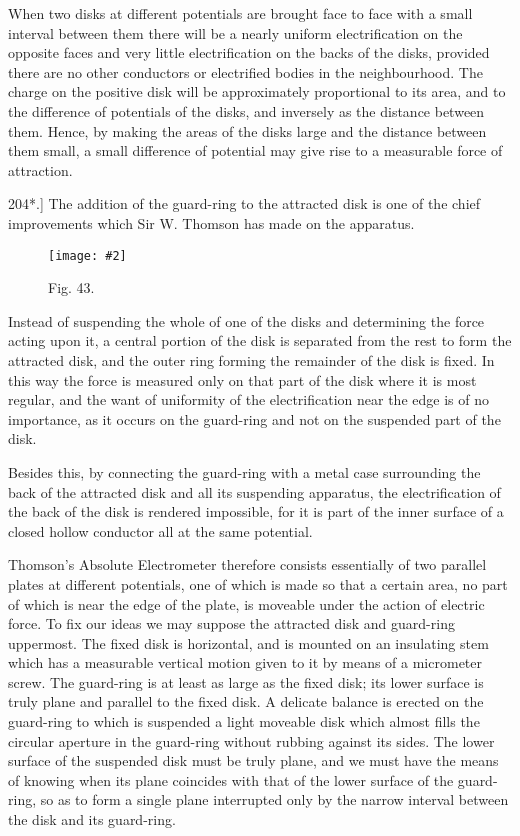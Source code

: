 \documentclass[12pt,oneside]{book}[2021/10/04]
\newcommand{\Runhead}[1]{\fancyhead[C]{\iffloatpage{}{\small#1}}}
\newcommand{\article}[1]{\phantomsection \label{art:#1}{#1.]}}
\newcommand{\widefig}[3]{
\begin{figure}[ht!]
\centering
\texttt{[image: \#2]}
\caption*{\small #3}
\end{figure}}
\newcommand{\¬}{\hphantom{0}}
\begin{document}
When two disks at different potentials are brought face to face
with a small interval between them there will be a nearly uniform
electrification on the opposite faces and very little electrification
on the backs of the disks, provided there are no other conductors
or electrified bodies in the neighbourhood. The charge on the
positive disk will be approximately proportional to its area, and to
the difference of potentials of the disks, and inversely as the distance
between them. Hence, by making the areas of the disks large
and the distance between them small, a small difference of potential
may give rise to a measurable force of attraction.
\Runhead{ATTRACTED DISK ELECTROMETERS.}

\article{204*} The addition of the guard-ring to the attracted disk is
one of the chief improvements which Sir W. Thomson has made
on the apparatus.

\widefig{0.63}{186.png}{Fig. 43.}
Instead of suspending the whole of one of the disks and determining
the force acting upon it, a central portion of the disk is
separated from the rest to form the attracted disk, and the outer
ring forming the remainder of the disk is fixed. In this way the
force is measured only on that part of the disk where it is most
regular, and the want of uniformity of the electrification near the
edge is of no importance, as it occurs on the guard-ring and not
on the suspended part of the disk.

Besides this, by connecting the guard-ring with a metal case
surrounding the back of the attracted disk and all its suspending
apparatus, the electrification of the back of the disk is rendered
impossible, for it is part of the inner surface of a closed hollow
conductor all at the same potential.

Thomson's Absolute Electrometer therefore consists essentially
of two parallel plates at different potentials, one of which is made
so that a certain area, no part of which is near the edge of the
plate, is moveable under the action of electric force. To fix our
ideas we may suppose the attracted disk and guard-ring uppermost.
The fixed disk is horizontal, and is mounted on an insulating stem
which has a measurable vertical motion given to it by means of
a micrometer screw. The guard-ring is at least as large as the
fixed disk; its lower surface is truly plane and parallel to the fixed
disk. A delicate balance is erected on the guard-ring to which
is suspended a light moveable disk which almost fills the circular
aperture in the guard-ring without rubbing against its sides. The
lower surface of the suspended disk must be truly plane, and we
must have the means of knowing when its plane coincides with that
of the lower surface of the guard-ring, so as to form a single plane
interrupted only by the narrow interval between the disk and its
guard-ring.
\end{document}
